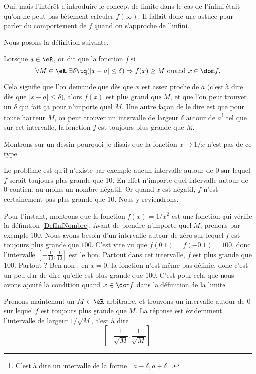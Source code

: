 Oui, mais l'intérêt d'introduire le concept de limite dans le cas de l'infini était qu'on ne peut pas bêtement calculer $f(\infty)$. Il fallait donc une astuce pour parler du comportement de $f$ quand on s'approche de l'infini.

Nous posons la définition suivante.
\begin{definition}      \label{DefInfNombre}
Lorsque $a\in\eR$, on dit que la fonction $f$  si
\[ 
  \forall M\in\eR,\exists \delta\tq (| x-a |\leq \delta )\Rightarrow f(x)\geq M\text{ quand }x\in\dom f.
\]
\end{definition}
Cela signifie que l'on demande que dès que $x$ est assez proche de $a$ (c'est à dire dès que $| x-a |\leq\delta$), alors $f(x)$ est plus grand que $M$, et que l'on peut trouver un $\delta$ qui fait ça pour n'importe quel $M$. Une autre façon de le dire est que pour toute hauteur $M$, on peut trouver un intervalle de largeur $\delta$ autour de $a$\footnote{C'est à dire un intervalle de la forme $[a-\delta,a+\delta]$.} tel que sur cet intervalle, la fonction $f$ est toujours plus grande que $M$.

Montrons sur un dessin pourquoi je disais que la fonction $x\to 1/x$ n'est pas de ce type.


Le problème est qu'il n'existe par exemple aucun intervalle autour de $0$ sur lequel $f$ serait toujours plus grande que $10$. En effet n'importe quel intervalle autour de $0$ contient au moins un nombre négatif. Or quand $x$ est négatif, $f$ n'est certainement pas plus grande que $10$. Nous y reviendrons.

Pour l'instant, montrons que la fonction $f(x)=1/x^2$ est une fonction qui vérifie la définition \ref{DefInfNombre}.  Avant de prendre n'importe quel $M$, prenons par exemple $100$. Nous avons besoin d'un intervalle autour de zéro sur lequel $f$ est toujours plus grande que $100$. C'est vite vu que $f(0.1)=f(-0.1)=100$, donc l'intervalle $[-\frac{ 1 }{ 10 },\frac{1}{ 10 }]$ est le bon. Partout dans cet intervalle, $f$ est plus grande que $100$. Partout ? Ben non : en $x=0$, la fonction n'est même pas définie, donc c'est un peu dur de dire qu'elle est plus grande que $100$. C'est pour cela que nous avons ajouté la condition \og quand $x\in\dom f$\fg{} dans la définition de la limite.

Prenons maintenant un $M\in\eR$ arbitraire, et trouvons un intervalle autour de $0$ sur lequel $f$ est toujours plus grande que $M$. La réponse est évidemment l'intervalle de largeur $1/\sqrt{M}$, c'est à dire 
\[ 
  \left[ -\frac{ 1 }{ \sqrt{M} },\frac{ 1 }{ \sqrt{M} } \right].
\]

